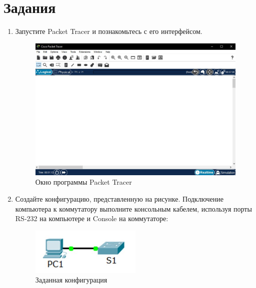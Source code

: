 \documentclass[bachelor, och, labwork]{shiza}
\begin{document}

\section{Задания}

\begin{enumerate}
    
    \item Запустите Packet Tracer и познакомьтесь с его интерфейсом.
    
    \begin{figure}[H]
        \centering      %
        \includegraphics[width=1\textwidth]{1}
        \caption{Окно программы Packet Tracer}
        \label{fig:image1}
    \end{figure}

    \item Создайте конфигурацию, представленную на рисунке. Подключение компьютера к коммутатору выполните 
    консольным кабелем, используя порты RS-232 на компьютере и Console на коммутаторе:

    \begin{figure}[H]
        \centering      %
        \includegraphics[width=0.5\textwidth]{2}
        \caption{Заданная конфигурация}
        \label{fig:image1}
    \end{figure}


\end{enumerate}
\end{document}
